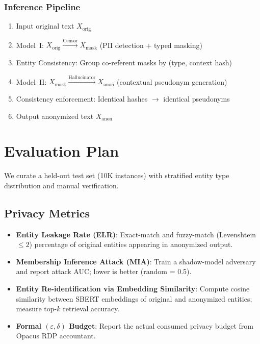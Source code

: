 \documentclass[9pt]{article}
\begin{document}
\subsubsection{Inference Pipeline}
\begin{enumerate}
    \item Input original text $X_{\text{orig}}$
    \item Model~I: $X_{\text{orig}} \xrightarrow{\text{Censor}} X_{\text{mask}}$ (PII detection + typed masking)
    \item Entity Consistency: Group co-referent masks by (type, context hash)
    \item Model~II: $X_{\text{mask}} \xrightarrow{\text{Hallucinator}} X_{\text{anon}}$ (contextual pseudonym generation)
    \item Consistency enforcement: Identical hashes $\rightarrow$ identical pseudonyms
    \item Output anonymized text $X_{\text{anon}}$
\end{enumerate}

\section{Evaluation Plan}
We curate a held-out test set (10K instances) with stratified entity type distribution and manual verification.

\subsection{Privacy Metrics}
\begin{itemize}
    \item \textbf{Entity Leakage Rate (ELR)}: Exact-match and fuzzy-match (Levenshtein $\leq 2$) percentage of original entities appearing in anonymized output.
    \item \textbf{Membership Inference Attack (MIA)}: Train a shadow-model adversary \cite{shokri2017membership} and report attack AUC; lower is better (random = 0.5).
    \item \textbf{Entity Re-identification via Embedding Similarity}: Compute cosine similarity between SBERT embeddings of original and anonymized entities; measure top-$k$ retrieval accuracy.
    \item \textbf{Formal $(\varepsilon, \delta)$ Budget}: Report the actual consumed privacy budget from Opacus RDP accountant.
\end{itemize}
\end{document}
